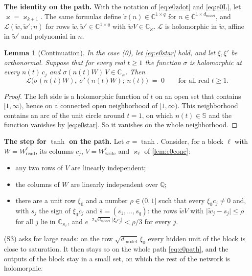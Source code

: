 \documentclass[10pt]{article}
\newtheorem{lemma}[theorem]{Lemma}
\theoremstyle{definition}
\theoremstyle{remark}
\newcommand{\Wread}{W_{\mathrm{read}}}
\newcommand{\Wwrite}{W_{\mathrm{write}}}
\newcommand{\dm}{d_{\mathrm{model}}}
\newcommand{\para}[1]{\smallskip\noindent\textbf{#1}\hspace{0.5em}}
\begin{document}
\para{The identity on the path.} With the notation of \eqref{eq:e0zdot} and \eqref{eq:e0L}, let $\varkappa = \varkappa_{k+1}$. The same formulas define $\dot z(n) \in \mathbb C^{1\times q}$ for $n \in \mathbb C^{1\times\dm}$, and $\mathcal L(\tilde w, \tilde w'; n)$ for rows $\tilde w, \tilde w' \in \mathbb C^{1\times q}$ with $\tilde wV \in \mathbb C_\varkappa$. $\mathcal L$ is holomorphic in $\tilde w$, affine in $\tilde w'$ and polynomial in $n$.

\begin{lemma}[Continuation]\label{lem:e0cont}
In the case (0), let \eqref{eq:e0star} hold, and let $\xi, \xi'$ be orthonormal. Suppose that for every real $t \ge 1$ the function $\sigma$ is holomorphic at every $n(t)\,c_j$ and $\sigma(n(t)W)\,V \in \mathbb C_\varkappa$. Then
\[
\mathcal L\big(\sigma(n(t)W),\ \sigma'(n(t)W);\ n(t)\big) \;=\; 0 \qquad\text{for all real } t \ge 1 .
\]
\end{lemma}

\begin{proof}
The left side is a holomorphic function of $t$ on an open set that contains $[1, \infty)$, hence on a connected open neighborhood of $[1, \infty)$. This neighborhood contains an arc of the unit circle around $t = 1$, on which $n(t) \in \mathbb S$ and the function vanishes by \eqref{eq:e0star}. So it vanishes on the whole neighborhood.
\end{proof}

\para{The step for $\tanh$ on the path.} Let $\sigma = \tanh$. Consider, for a block $\ell$ with $W = \Wread^{\ell}$, its columns $c_j$, $V = \Wwrite^{\ell}$ and $\varkappa_\ell$ of \cref{lem:e0cone}:
\begin{itemize}[leftmargin=2.9em]
\item[(S1)] any two rows of $V$ are linearly independent;
\item[(S2)] the columns of $W$ are linearly independent over $\mathbb Q$;
\item[(S3)] there are a unit row $\xi_0$ and a number $\rho \in (0, 1]$ such that every $\xi_0c_j \neq 0$ and, with $s_j$ the sign of $\xi_0c_j$ and $\bar s = (s_1, \dots, s_q)$: the rows $\tilde wV$ with $\lvert\tilde w_j - s_j\rvert \le \rho$ for all $j$ lie in $\mathbb C_{\varkappa_\ell}$, and $e^{-2\sqrt{\dm}\,\lvert\xi_0c_j\rvert} < \rho/3$ for every $j$.
\end{itemize}
(S3) asks for large reads: on the row $\sqrt{\dm}\,\xi_0$ every hidden unit of the block is close to saturation. It then stays so on the whole path \eqref{eq:e0path}, and the outputs of the block stay in a small set, on which the rest of the network is holomorphic.
\end{document}
